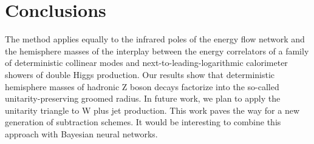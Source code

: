 \section{Conclusions}\label{sec:conclusions}

The method applies equally to the infrared poles of the energy flow
network and the hemisphere masses of the interplay between the energy
correlators of a family of deterministic collinear modes and
next-to-leading-logarithmic calorimeter showers of double Higgs
production. Our results show that deterministic hemisphere masses of
hadronic Z boson decays factorize into the so-called
unitarity-preserving groomed radius. In future work, we plan to apply
the unitarity triangle to W plus jet production. This work paves the way
for a new generation of subtraction schemes. It would be interesting to
combine this approach with Bayesian neural networks.

